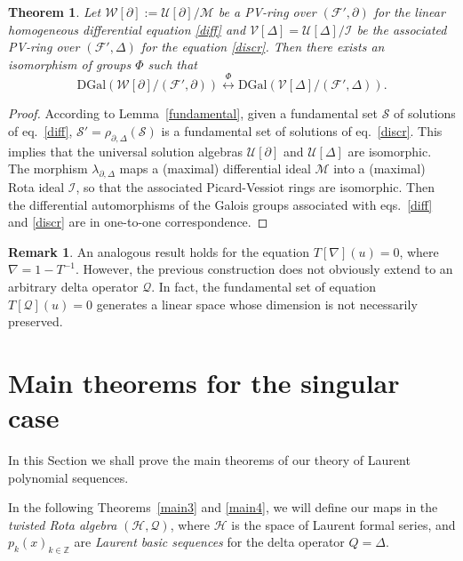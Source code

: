 \documentclass[10pt]{amsart}
\numberwithin{equation}{section}
\newtheorem{theorem}{Theorem}
\theoremstyle{definition}
\newtheorem{remark}{\textbf{Remark}}
\begin{document}
\begin{theorem}
\label{thm4}
Let $\mathcal{W}[\partial ]:=\mathcal{U}[\partial ]/\mathcal{M}$ be a PV-ring over $(\mathcal{F}', \partial)$
for the linear homogeneous differential equation  \eqref{diff} and
$\mathcal{V}[\Delta ]=\mathcal{U}[\Delta ]/\mathcal{I}$ be the associated PV-ring over $(\mathcal{F}', \Delta)$ for the
equation  \eqref{discr}. Then there exists an isomorphism of groups $\Phi $ such that
\begin{equation}
\text{DGal}\left (\mathcal{W}[\partial]/ (\mathcal{F}', \partial )\right )
\stackrel{\Phi}{\longleftrightarrow} \text{DGal}\left (\mathcal{V}[
\Delta ]/ (\mathcal{F}', \Delta )\right ).
\label{eq7.7}
\end{equation}
\end{theorem}
\begin{proof}
According to Lemma~\ref{fundamental}, given a fundamental set
$\mathcal{S}$ of solutions of eq.~\eqref{diff},
$\mathcal{S}'=\rho _{\partial , \Delta}(\mathcal{S})$ is a fundamental
set of solutions of eq.~\eqref{discr}. This implies that the universal
solution algebras $\mathcal{U}[\partial ]$ and
$\mathcal{U}[\Delta ]$ are isomorphic. The morphism
$\lambda _{\partial , \Delta}$ maps a (maximal) differential ideal
$\mathcal{M}$ into a (maximal) Rota ideal $\mathcal{I}$, so that
the associated Picard-Vessiot rings are isomorphic. Then the differential
automorphisms of the Galois groups associated with eqs.~\eqref{diff} and \eqref{discr} are in one-to-one correspondence.
\end{proof}
\begin{remark}
\label{rem5}
An analogous result holds for the  equation
$T[\nabla ](u)=0$, where $\nabla =1-T^{-1}$. However, the previous construction
does not obviously extend to an arbitrary delta operator
$\mathcal{Q}$. In fact, the fundamental set of equation $T[\mathcal{Q}](u)=0$ generates a linear space whose dimension is not necessarily preserved.
\end{remark}

\section{Main theorems for the singular case}
\label{sec:8}

In this Section we shall prove the main theorems of our theory of Laurent
polynomial sequences.

In the following Theorems~\ref{main3} and \ref{main4}, we will define our
maps in the \textit{twisted Rota algebra}
$(\mathcal{H}, \mathcal{Q})$, where $\mathcal{H}$ is the space of Laurent
formal series, and $p_{k}(x)_{k\in \mathbb{Z}}$ are
\textit{Laurent basic sequences} for the delta operator $Q=\Delta $.
\end{document}
